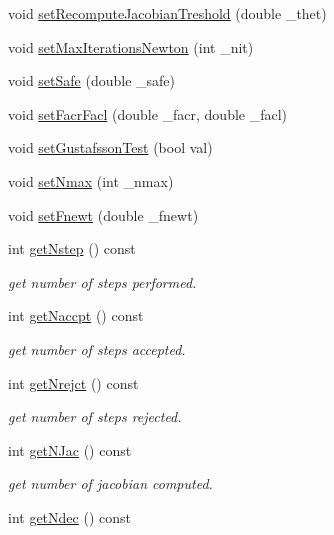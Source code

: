\begin{DoxyCompactItemize}
\item 
void \hyperlink{classodes_1_1Radau5cc_a6ded95131d3d3475848df0db823eddcf}{set\-Recompute\-Jacobian\-Treshold} (double \-\_\-thet)
\item 
void \hyperlink{classodes_1_1Radau5cc_a3ba97342c5095591820ee7e085ac72a2}{set\-Max\-Iterations\-Newton} (int \-\_\-nit)
\item 
void \hyperlink{classodes_1_1Radau5cc_a0a606af9c7bf97f1c8b0f8f3aa9d7fb1}{set\-Safe} (double \-\_\-safe)
\item 
void \hyperlink{classodes_1_1Radau5cc_ae688f9f0edc04e3c0c2a670d62b51837}{set\-Facr\-Facl} (double \-\_\-facr, double \-\_\-facl)
\item 
void \hyperlink{classodes_1_1Radau5cc_a0bb7e7fe363b343a024500e031e6b7e9}{set\-Gustafsson\-Test} (bool val)
\item 
void \hyperlink{classodes_1_1Radau5cc_a94a01a41bda7f6e63e756fd8ba9f50f7}{set\-Nmax} (int \-\_\-nmax)
\item 
void \hyperlink{classodes_1_1Radau5cc_a19f8c9954b7d6cfa2dfbb9718c3cd506}{set\-Fnewt} (double \-\_\-fnewt)
\item 
int \hyperlink{classodes_1_1Radau5cc_a02c7ae60849eec0ab3229c702d027441}{get\-Nstep} () const 
\begin{DoxyCompactList}\small\item\em get number of steps performed. \end{DoxyCompactList}\item 
int \hyperlink{classodes_1_1Radau5cc_af6a62564a5e98a69a906c75c077f918d}{get\-Naccpt} () const 
\begin{DoxyCompactList}\small\item\em get number of steps accepted. \end{DoxyCompactList}\item 
int \hyperlink{classodes_1_1Radau5cc_a6f7c73b74c3de68b1e8ed9cc948f5da4}{get\-Nrejct} () const 
\begin{DoxyCompactList}\small\item\em get number of steps rejected. \end{DoxyCompactList}\item 
int \hyperlink{classodes_1_1Radau5cc_ad369e8cda90230d3632c61aea00eef74}{get\-N\-Jac} () const 
\begin{DoxyCompactList}\small\item\em get number of jacobian computed. \end{DoxyCompactList}\item 
int \hyperlink{classodes_1_1Radau5cc_a86803d5cfa5219a6fbbb63bd9576ecf1}{get\-Ndec} () const 

\end{DoxyCompactItemize}
